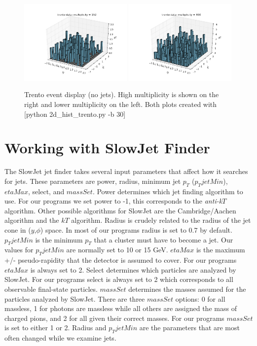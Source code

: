 \documentclass[11pt]{article}
\begin{document}
\begin{figure}[h]
\begin{center}
\includegraphics[width=0.49\textwidth]{2d_hist_trento.png}
\includegraphics[width=0.49\textwidth]{2d_hist_trento2.png}
\label{fig_label}
\caption{Trento event display (no jets). High multiplicity is shown on the right and lower multiplicity on the left. Both plots created with [python 2d\_hist\_trento.py -b 30]}
\end{center}
\end{figure}

\section{Working with SlowJet Finder}
%
%
The SlowJet jet finder takes several input parameters that affect how it searches for jets. These parameters are power, radius, minimum jet $p_T$ ($p_TjetMin$), $etaMax$, select, and $massSet$. Power determines which jet finding algorithm to use. For our programs we set power to -1, this corresponds to the {\it anti-k$T$} algorithm. Other possible algorithms for SlowJet are the Cambridge/Aachen algorithm and the $kT$ algorithm. Radius is crudely related to the radius of the jet cone in ($y$,$\phi$) space. In most of our programs radius is set to 0.7 by default. $p_TjetMin$ is the minimum $p_T$ that a cluster must have to become a jet. Our values for $p_TjetMin$ are normally set to 10 or 15 GeV. $etaMax$ is the maximum +/- pseudo-rapidity that the detector is assumed to cover. For our programs $etaMax$ is always set to 2. Select determines which particles are analyzed by SlowJet. For our programs select is always set to 2 which corresponds to all observable final-state particles. $massSet$ determines the masses assumed for the particles analyzed by SlowJet. There are three $massSet$ options: 0 for all massless, 1 for photons are massless while all others are assigned the mass of charged pions, and 2 for all given their correct masses. For our programs $massSet$ is set to either 1 or 2. Radius and $p_TjetMin$ are the parameters that are most often changed while we examine jets.
\end{document}
